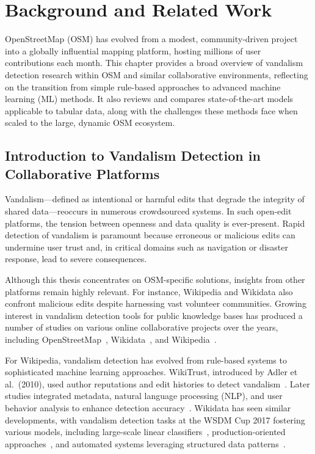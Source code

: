 \documentclass[
    13pt, %
    a4paper, %
    listof=totoc, %
    bibliography=totoc, %
    index=totoc, %
    headsepline
]{scrreprt}
\begin{document}

\chapter{Background and Related Work}\label{background}

OpenStreetMap (OSM) has evolved from a modest, community-driven project into a globally influential mapping platform, hosting millions of user contributions each month. This chapter provides a broad overview of vandalism detection research within OSM and similar collaborative environments, reflecting on the transition from simple rule-based approaches to advanced machine learning (ML) methods. It also reviews and compares state-of-the-art models applicable to tabular data, along with the challenges these methods face when scaled to the large, dynamic OSM ecosystem.

\section{Introduction to Vandalism Detection in Collaborative Platforms}
\label{sec:intro_vandalism_collab}

Vandalism—defined as intentional or harmful edits that degrade the integrity of shared data—reoccurs in numerous crowdsourced systems. In such open-edit platforms, the tension between openness and data quality is ever-present. Rapid detection of vandalism is paramount because erroneous or malicious edits can undermine user trust and, in critical domains such as navigation or disaster response, lead to severe consequences.

Although this thesis concentrates on OSM-specific solutions, insights from other platforms remain highly relevant. For instance, Wikipedia and Wikidata also confront malicious edits despite harnessing vast volunteer communities. Growing interest in vandalism detection tools for public knowledge bases has produced a number of studies on various online collaborative projects over the years, including OpenStreetMap~\cite{OSMPatrol, Truong2018, Truong2020}, Wikidata~\cite{Heindorf2016, Crescenzi2017, Grigorev2017, Heindorf2017, Sarabadani2017}, and Wikipedia~\cite{Adler2010, Adler2011, Itakura2009, Kumar2015, McKeown2010, Smets2008, Tran2014, Yuan2017}.

For Wikipedia, vandalism detection has evolved from rule-based systems to sophisticated machine learning approaches. WikiTrust, introduced by Adler et al.\ (2010), used author reputations and edit histories to detect vandalism~\cite{Adler2010}. Later studies integrated metadata, natural language processing (NLP), and user behavior analysis to enhance detection accuracy~\cite{Adler2011, Itakura2009, Kumar2015, Smets2008}. Wikidata has seen similar developments, with vandalism detection tasks at the WSDM Cup 2017 fostering various models, including large-scale linear classifiers~\cite{Grigorev2017}, production-oriented approaches~\cite{Crescenzi2017}, and automated systems leveraging structured data patterns~\cite{Heindorf2017, Sarabadani2017}.
\end{document}
